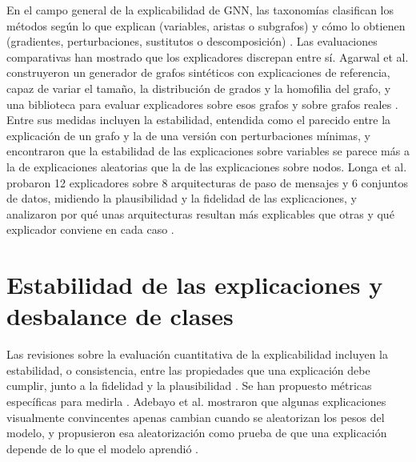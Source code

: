 En el campo general de la explicabilidad de GNN, las taxonomías clasifican los métodos según lo que explican (variables, aristas o subgrafos) y cómo lo obtienen (gradientes, perturbaciones, sustitutos o descomposición) \cite{Yuan2023Taxonomic}. Las
evaluaciones comparativas han mostrado que los explicadores discrepan entre sí. Agarwal et al.
construyeron un generador de grafos sintéticos con explicaciones de referencia, capaz de
variar el tamaño, la distribución de grados y la homofilia del grafo, y una biblioteca para
evaluar explicadores sobre esos grafos y sobre grafos reales \cite{Agarwal2023Evaluating}.
Entre sus medidas incluyen la estabilidad, entendida como el parecido entre la explicación de un
grafo y la de una versión con perturbaciones mínimas, y encontraron que la estabilidad de las
explicaciones sobre variables se parece más a la de explicaciones aleatorias que la de las
explicaciones sobre nodos. Longa et al. probaron 12 explicadores
sobre 8 arquitecturas de paso de mensajes y 6 conjuntos de datos, midiendo la plausibilidad y la
fidelidad de las explicaciones, y analizaron por qué unas
arquitecturas resultan más explicables que otras y qué explicador conviene en cada caso
\cite{Longa2024Explaining}.

\section{Estabilidad de las explicaciones y desbalance de clases}\label{sec:ea_estab}

Las revisiones sobre la evaluación cuantitativa de la explicabilidad incluyen la estabilidad,
o consistencia, entre las propiedades que una explicación debe cumplir, junto a la fidelidad y
la plausibilidad \cite{Nauta2023Anecdotal, Bodria2023Benchmarking}. Se han propuesto métricas
específicas para medirla \cite{Gawantka2024Explanations}. Adebayo et al. mostraron que algunas
explicaciones visualmente convincentes apenas cambian cuando se aleatorizan los pesos del
modelo, y propusieron esa aleatorización como prueba de que una explicación depende de lo que
el modelo aprendió \cite{Adebayo2018Sanity}.

